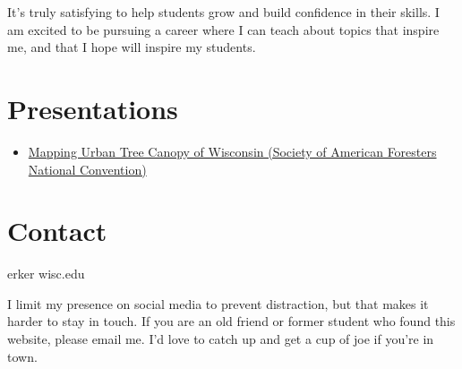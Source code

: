 \documentclass{article}
\begin{document}
It's truly satisfying to help students grow and build confidence in their
skills.  I am excited to be pursuing a career where I can teach about
topics that inspire me, and that I hope will inspire my students.

\section*{Presentations}
\label{sec:org9c1c215}
\begin{itemize}
\item \href{presentations/SAF_20161105/saf_presentation.html}{Mapping Urban Tree Canopy of Wisconsin (Society of American Foresters National Convention)}
\end{itemize}

\section*{Contact}
\label{sec:org3950779}

erker wisc.edu

I limit my presence on social media to prevent distraction, but that
makes it harder to stay in touch.  If you are an old friend or former
student who found this website, please email me.  I'd love to catch up
and get a cup of joe if you're in town.
\end{document}
